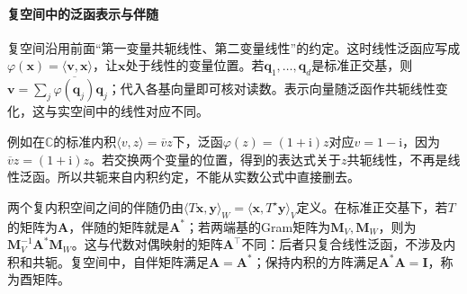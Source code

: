 \paragraph{复空间中的泛函表示与伴随}
复空间沿用前面“第一变量共轭线性、第二变量线性”的约定。这时线性泛函应写成$\varphi(\bm x)=\langle\bm v,\bm x\rangle$，让$\bm x$处于线性的变量位置。若$\bm q_1,\ldots,\bm q_d$是标准正交基，则$\bm v=\sum_j\overline{\varphi(\bm q_j)}\bm q_j$；代入各基向量即可核对读数。表示向量随泛函作共轭线性变化，这与实空间中的线性对应不同。

例如在$\mathbb C$的标准内积$\langle v,z\rangle=\overline v z$下，泛函$\varphi(z)=(1+\mathrm i)z$对应$v=1-\mathrm i$，因为$\overline v z=(1+\mathrm i)z$。若交换两个变量的位置，得到的表达式关于$z$共轭线性，不再是线性泛函。所以共轭来自内积约定，不能从实数公式中直接删去。

两个复内积空间之间的伴随仍由$\langle T\bm x,\bm y\rangle_W=\langle\bm x,T^\star\bm y\rangle_V$定义。在标准正交基下，若$T$的矩阵为$\bm A$，伴随的矩阵就是$\bm A^*$；若两端基的Gram矩阵为$\bm M_V,\bm M_W$，则为$\bm M_V^{-1}\bm A^*\bm M_W$。这与代数对偶映射的矩阵$\bm A^\top$不同：后者只复合线性泛函，不涉及内积和共轭。复空间中，自伴矩阵满足$\bm A=\bm A^*$；保持内积的方阵满足$\bm A^*\bm A=\bm I$，称为酉矩阵。

